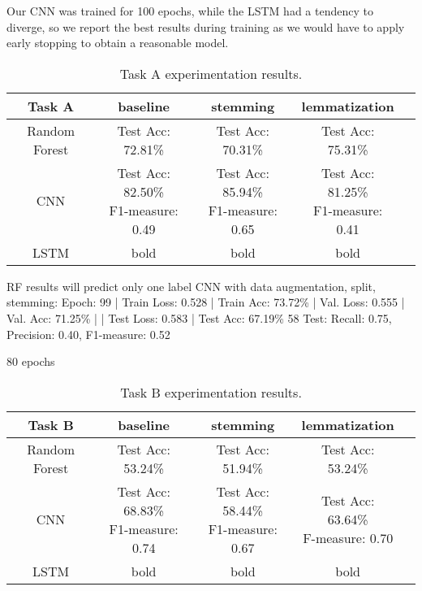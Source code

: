 \documentclass[11pt,a4paper]{article}
\begin{document}
Our CNN was trained for 100 epochs, while the LSTM had a tendency to diverge, so we report the best results during training as we would have to apply early stopping to obtain a reasonable model.

\begin{table*}[!htb]
\begin{center}
\begin{tabular}{|c|cccc|}
\hline \bf Task A & \bf baseline & \bf stemming & \bf lemmatization & \\ \hline
Random Forest & Test Acc: 72.81\% & Test Acc: 70.31\% & Test Acc: 75.31\% & \\ \hline
CNN & \shortstack{Test Acc: 82.50\% \\ F1-measure: 0.49}  & \shortstack{Test Acc: 85.94\% \\ F1-measure: 0.65} & \shortstack{Test Acc: 81.25\% \\ F1-measure: 0.41} & \\ \hline
LSTM & bold & bold & bold & \\
\hline
\end{tabular}
\end{center}
\caption{\label{font-table} Task A experimentation results. }
\label{table:1}
\end{table*}

RF results will predict only one label
CNN with data augmentation, split, stemming:
 Epoch: 99 | Train Loss: 0.528 | Train Acc: 73.72\% | Val. Loss: 0.555 | Val. Acc: 71.25\% |
| Test Loss: 0.583 | Test Acc: 67.19\%
58
Test: Recall: 0.75, Precision: 0.40, F1-measure: 0.52

80 epochs

\begin{table*}[!htb]
\begin{center}
\begin{tabular}{|c|cccc|}
\hline \bf Task B & \bf baseline & \bf stemming & \bf lemmatization & \\ \hline
Random Forest & Test Acc: 53.24\% & Test Acc: 51.94\% & Test Acc: 53.24\% & \\ \hline
CNN & \shortstack{Test Acc: 68.83\% \\ F1-measure: 0.74}  & \shortstack{Test Acc: 58.44\% \\ F1-measure: 0.67} & \shortstack{Test Acc: 63.64\% \\ F-measure: 0.70} & \\ \hline
LSTM & bold & bold & bold & \\
\hline
\end{tabular}
\end{center}
\caption{\label{font-table} Task B experimentation results.}
\label{table:2}
\end{table*}
\end{document}

